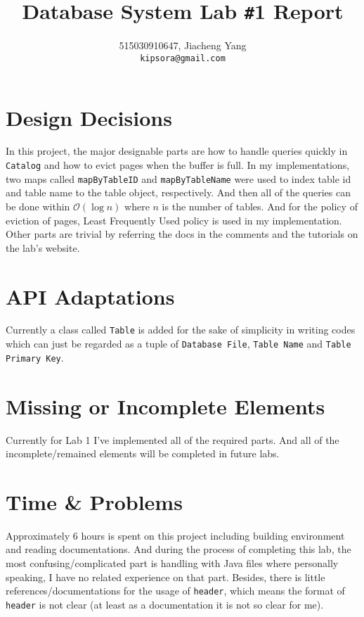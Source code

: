 \documentclass{article}
\title{Database System Lab \texttt{\#}1 Report}
\author{515030910647, Jiacheng Yang\\\texttt{kipsora@gmail.com}}
\begin{document}
    \maketitle
    \section{Design Decisions}
        In this project, the major designable parts are how to handle queries quickly in \texttt{Catalog} and how to evict pages when the buffer is full. In my implementations, two maps called \texttt{mapByTableID} and \texttt{mapByTableName} were used to index table id and table name to the table object, respectively. And then all of the queries can be done within $\mathcal{O}(\log n)$ where $n$ is the number of tables. And for the policy of eviction of pages, Least Frequently Used policy is used in my implementation. Other parts are trivial by referring the docs in the comments and the tutorials on the lab's website.

    \section{API Adaptations}
        Currently a class called \texttt{Table} is added for the sake of simplicity in writing codes which can just be regarded as a tuple of \texttt{Database File}, \texttt{Table Name} and \texttt{Table Primary Key}.

    \section{Missing or Incomplete Elements}
        Currently for Lab 1 I've implemented all of the required parts. And all of the incomplete/remained elements will be completed in future labs.

    \section{Time \& Problems}
        Approximately 6 hours is spent on this project including building environment and reading documentations. And during the process of completing this lab, the most confusing/complicated part is handling with Java files where personally speaking, I have no related experience on that part. Besides, there is little references/documentations for the usage of \texttt{header}, which means the format of \texttt{header} is not clear (at least as a documentation it is not so clear for me).
\end{document}
